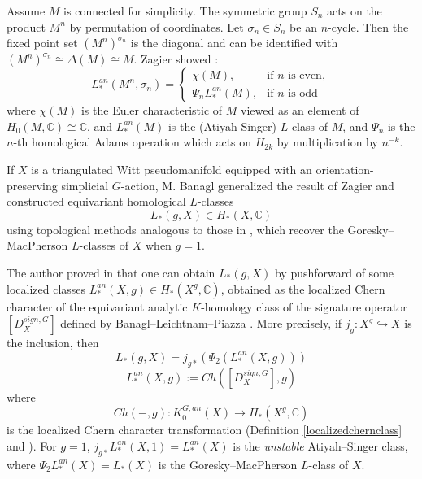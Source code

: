 \documentclass[11pt,leqno,twoside]{amsart}
\theoremstyle{plainsl}
\theoremstyle{definition}
\newcommand{\C}{\mathbb{C}}
\begin{document}
Assume  $M$ is connected for simplicity.  The symmetric group $S_n$ acts on the product $M^n$ by permutation of coordinates. Let $\sigma_n\in S_n$ be an $n$-cycle. Then the fixed point set $(M^n)^{\sigma_n}$  is the diagonal and can be identified with  $(M^n)^{\sigma_n}\cong \Delta(M)\cong M$.  Zagier showed 
\cite[Prop.~2]{Z2}:
\begin{equation}\label{zagiersm}
    L^{an}_*(M^n,\sigma_n)=
\begin{cases}
\chi(M), & \text{if } n \text{ is even},\\[4pt]
\Psi_nL^{an}_*(M), & \text{if } n \text{ is odd}
\end{cases}
\end{equation}
where $\chi(M)$ is the Euler characteristic of $M$ viewed as an element of $H_0(M,\C)\cong \C$, and $L^{an}_*(M)$ is the (Atiyah-Singer) $L$-class of $M$, and $\Psi_n$ is the $n$-th homological Adams operation which acts on $H_{2k}$ by multiplication by $n^{-k}$.


If $X$ is a triangulated Witt pseudomanifold equipped with an orientation-preserving simplicial $G$-action, M. Banagl \cite{B} generalized the result of Zagier and  constructed equivariant homological $L$-classes $$L_*(g,X)\in H_*(X,\mathbb{C})$$ using topological methods analogous to those in \cite{Z}, which recover the Goresky--MacPherson $L$-classes of $X$ when $g=1$. 

The author proved in \cite{A} that one can obtain $L_*(g,X)$ by pushforward of some localized classes $L^{an}_*(X,g)\in H_*(X^g,\mathbb{C})$, obtained as the localized Chern character of the equivariant analytic $K$-homology class of the signature operator $\left[D_X^{sign,G}\right]$ defined by Banagl--Leichtnam--Piazza \cite{BLP}. More precisely, if $j_g:X^g\hookrightarrow X$ is the inclusion, then
\begin{equation} \label{realtionbanaglme}
    L_*(g,X)=j_{g*}(\Psi_2(L^{an}_*(X,g)))
\end{equation}
\begin{equation}\label{loclaizedlclasschern}
    L^{an}_*(X,g):=Ch(\left[D_X^{sign,G}\right],g)
\end{equation}
 where  $$Ch(-,g):K^{G,an}_0(X)\rightarrow H_*(X^g,\mathbb{C})$$ is the localized Chern character  transformation (Definition \ref{localizedchernclass} and \cite{A}). For $g=1$, $ j_{g*}L^{an}_*(X,1)=L^{an}_*(X)$ is the \textit{unstable} Atiyah–Singer class,  where $\Psi_2L^{an}_*(X)=L_*(X)$ is the Goresky--MacPherson $L$-class of $X$.
 
\end{document}
